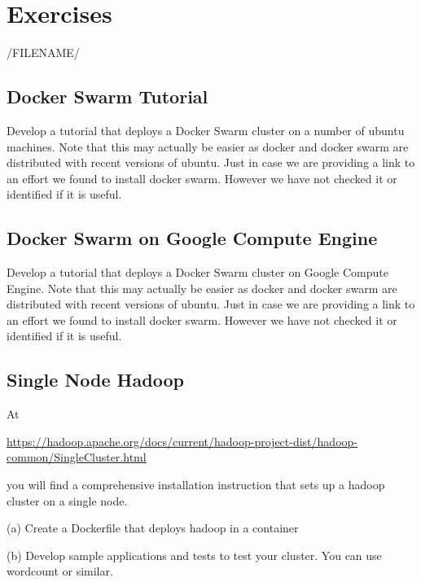 

\chapter{Exercises}
/FILENAME/

\section{Docker Swarm Tutorial}

\begin{exercise}

  Develop a tutorial that deploys a Docker Swarm cluster on a number
  of ubuntu machines. Note that this may actually be easier as docker
  and docker swarm are distributed with recent versions of
  ubuntu. Just in case we are providing a link to an effort we found
  to install docker swarm. However we have not checked it or
  identified if it is useful.
 

\end{exercise}


\section{Docker Swarm on Google Compute Engine}

\begin{exercise}
  Develop a tutorial that deploys a Docker Swarm cluster on Google
  Compute Engine. Note that this may actually be easier as docker
  and docker swarm are distributed with recent versions of
  ubuntu. Just in case we are providing a link to an effort we found
  to install docker swarm. However we have not checked it or
  identified if it is useful.


\end{exercise}

\section{Single Node Hadoop}

\begin{exercise}

At

\url{https://hadoop.apache.org/docs/current/hadoop-project-dist/hadoop-common/SingleCluster.html}

you will find a comprehensive installation instruction that sets up a
hadoop cluster on a single node. 

(a) Create a Dockerfile that deploys hadoop in a container

(b) Develop sample applications and tests to test your cluster. You
can use wordcount or similar.

\end{exercise}


